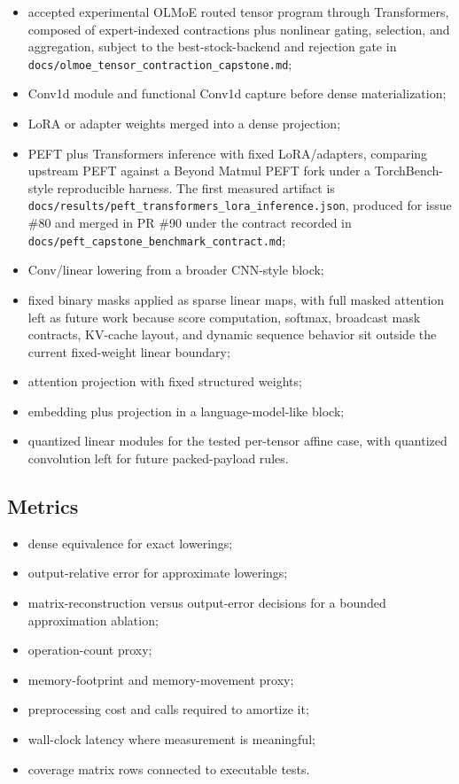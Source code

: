 \documentclass[11pt]{article}
\begin{document}
\begin{itemize}
  \item accepted experimental OLMoE routed tensor program through Transformers, composed
  of expert-indexed contractions plus nonlinear gating, selection, and
  aggregation,
  subject to the best-stock-backend and rejection gate in
  \texttt{docs/olmoe\_tensor\_contraction\_capstone.md};
  \item Conv1d module and functional Conv1d capture before dense
  materialization;
  \item LoRA or adapter weights merged into a dense projection;
  \item PEFT plus Transformers inference with fixed LoRA/adapters, comparing
  upstream PEFT against a Beyond Matmul PEFT fork under a TorchBench-style
  reproducible harness. The first measured artifact is
  \texttt{docs/results/peft\_transformers\_lora\_inference.json}, produced for
  issue \#80 and merged in PR \#90 under the contract recorded in
  \texttt{docs/peft\_capstone\_benchmark\_contract.md};
  \item Conv/linear lowering from a broader CNN-style block;
  \item fixed binary masks applied as sparse linear maps, with full masked
  attention left as future work because score computation, softmax, broadcast
  mask contracts, KV-cache layout, and dynamic sequence behavior sit outside
  the current fixed-weight linear boundary;
  \item attention projection with fixed structured weights;
  \item embedding plus projection in a language-model-like block;
  \item quantized linear modules for the tested per-tensor affine case, with
  quantized convolution left for future packed-payload rules.
\end{itemize}

\subsection{Metrics}

\begin{itemize}
  \item dense equivalence for exact lowerings;
  \item output-relative error for approximate lowerings;
  \item matrix-reconstruction versus output-error decisions for a bounded
  approximation ablation;
  \item operation-count proxy;
  \item memory-footprint and memory-movement proxy;
  \item preprocessing cost and calls required to amortize it;
  \item wall-clock latency where measurement is meaningful;
  \item coverage matrix rows connected to executable tests.
\end{itemize}
\end{document}
